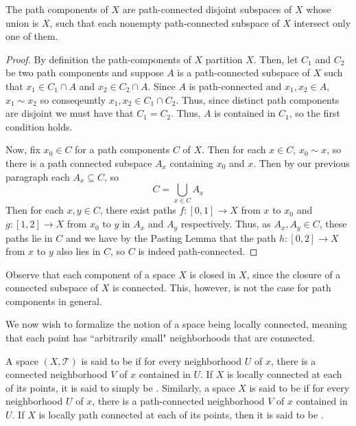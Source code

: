 \documentclass[12pt, a4paper, oneside, openright, titlepage]{book}
\begin{document}
\begin{thm}
    The path components of $X$ are path-connected disjoint subspaces of $X$ whose union is $X$, such that each nonempty path-connected subspace of $X$ intersect only one of them.
\end{thm}
\begin{proof}
    By definition the path-components of $X$ partition $X$. Then, let $C_1$ and $C_2$ be two path components and suppose $A$ is a path-connected subspace of $X$ such that $x_1 \in C_1 \cap A$ and $x_2 \in C_2 \cap A$. Since $A$ is path-connected and $x_1, x_2 \in A$, $x_1 \sim x_2$ so conseqeuntly $x_1,x_2 \in C_1 \cap C_2$. Thus, since distinct path components are disjoint we must have that $C_1 = C_2$. Thus, $A$ is contained in $C_1$, so the first condition holds.

    Now, fix $x_0 \in C$ for a path components $C$ of $X$. Then for each $x \in C$, $x_0 \sim x$, so there is a path connected subspace $A_x$ containing $x_0$ and $x$. Then by our previous paragraph each $A_x \subseteq C$, so \begin{equation*}
        C =\bigcup\limits_{x\in C}A_x
    \end{equation*}
    Then for each $x,y \in C$, there exist paths $f:[0,1]\rightarrow X$ from $x$ to $x_0$ and $g:[1,2]\rightarrow X$ from $x_0$ to $y$ in $A_x$ and $A_y$ respectively. Thus, as $A_x,A_y \in C$, these paths lie in $C$ and we have by the Pasting Lemma that the path $h:[0,2]\rightarrow X$ from $x$ to $y$ also lies in $C$, so $C$ is indeed path-connected.
\end{proof}

Observe that each component of a space $X$ is closed in $X$, since the closure of a connected subspace of $X$ is connected. This, however, is not the case for path components in general.

We now wish to formalize the notion of a space being locally connected, meaning that each point has ``arbitrarily small" neighborhoods that are connected.

\begin{defn}
    A space $(X,\mathcal{T})$ is said to be  if for every neighborhood $U$ of $x$, there is a connected neighborhood $V$ of $x$ contained in $U$. If $X$ is locally connected at each of its points, it is said to simply be . Similarly, a space $X$ is said to be  if for every neighborhood $U$ of $x$, there is a path-connected neighborhood $V$ of $x$ contained in $U$. If $X$ is locally path connected at each of its points, then it is said to be .
\end{defn}
\end{document}
